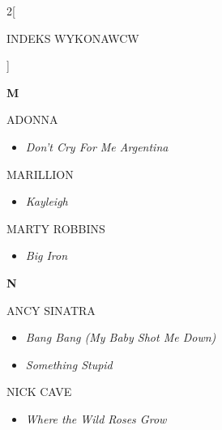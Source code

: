 \documentclass[a4paper]{report}
\begin{document}
\begin{multicols*}{2}[\begin{Huge}INDEKS WYKONAWCW\end{Huge}\vspace{1cm}]
\begin{minipage}{\columnwidth}
\begin{itemize}[topsep=3pt, after=\vspace{3mm}]
	\end{itemize}
\end{minipage}
\begin{minipage}{\columnwidth}
	\begin{Large}\textbf{M}\end{Large}ADONNA 
	\begin{itemize}[topsep=3pt, after=\vspace{3mm}]
		\itemsep0em
		\item[]\textit{Don't Cry For Me Argentina}  \\
	\end{itemize}
\end{minipage}
\begin{minipage}{\columnwidth}
	MARILLION 
	\begin{itemize}[topsep=3pt, after=\vspace{3mm}]
		\itemsep0em
		\item[]\textit{Kayleigh}  \\
	\end{itemize}
\end{minipage}
\begin{minipage}{\columnwidth}
	MARTY ROBBINS 
	\begin{itemize}[topsep=3pt, after=\vspace{3mm}]
		\itemsep0em
		\item[]\textit{Big Iron}  \\
	\end{itemize}
\end{minipage}
\begin{minipage}{\columnwidth}
	\begin{Large}\textbf{N}\end{Large}ANCY SINATRA 
	\begin{itemize}[topsep=3pt, after=\vspace{3mm}]
		\itemsep0em
		\item[]\textit{Bang Bang (My Baby Shot Me Down)}  \\
		\item[]  \textit{Something Stupid}  \\
	\end{itemize}
\end{minipage}
\begin{minipage}{\columnwidth}
	NICK CAVE 
	\begin{itemize}[topsep=3pt, after=\vspace{3mm}]
		\itemsep0em
		\item[]\textit{Where the Wild Roses Grow}  \\

\end{itemize}
\end{minipage}
\end{multicols*}
\end{document}
